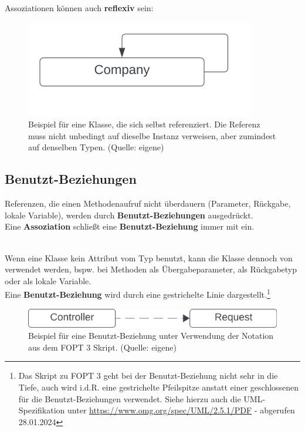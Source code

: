 \noindent
Assoziationen können auch \textbf{reflexiv} sein:


\begin{figure}
    \centering
    \includegraphics[scale=0.5]{chapters/fopt3/img/reflexive}
    \caption{Beispiel für eine Klasse, die sich selbst referenziert. Die Referenz muss nicht unbedingt auf dieselbe Instanz verweisen, aber zumindest auf denselben Typen. (Quelle: eigene)}
    \label{fig:reflexive}
\end{figure}

\newpage
\subsection{Benutzt-Beziehungen}

\begin{tcolorbox}[enlarge top by=0.5cm,enlarge bottom by=0.5cm]
    Referenzen, die einen Methodenaufruf nicht überdauern (Parameter, Rückgabe, lokale Variable), werden durch \textbf{Benutzt-Beziehungen} ausgedrückt.\\

    \noindent
    Eine \textbf{Assoziation} schließt eine \textbf{Benutzt-Beziehung} immer mit ein.
\end{tcolorbox}\\

\noindent
Wenn eine Klasse  kein Attribut vom Typ  benutzt, kann die Klasse  dennoch von  verwendet werden, bspw. bei Methoden als Übergabeparameter, als Rückgabetyp oder als lokale Variable.\\

\noindent
Eine \textbf{Benutzt-Beziehung} wird durch eine gestrichelte Linie dargestellt.\footnote{
Das Skript zu FOPT 3 geht bei der Benutzt-Beziehung nicht sehr in die Tiefe, auch wird i.d.R. eine gestrichelte Pfeilspitze anstatt einer geschlossenen für die Benutzt-Beziehungen verwendet. Siehe hierzu auch die UML-Spezifikation unter \url{https://www.omg.org/spec/UML/2.5.1/PDF} - abgerufen 28.01.2024
}


\begin{figure}
    \centering
    \includegraphics[scale=0.5]{chapters/fopt3/img/uses}
    \caption{Beispiel für eine Benutzt-Beziehung unter Verwendung der Notation aus dem FOPT 3 Skript. (Quelle: eigene)}
    \label{fig:uses}
\end{figure}

